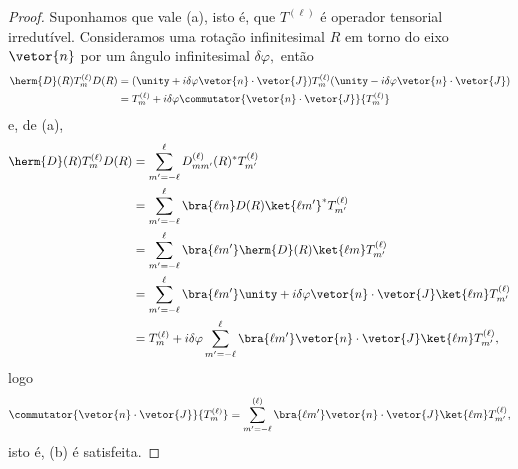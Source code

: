 \begin{proof}
   Suponhamos que vale (a), isto é, que \(T^{(\ell)}\) é operador tensorial irredutível. Consideramos uma rotação infinitesimal \(R\) em torno do eixo \(\vetor{n}\) por um ângulo infinitesimal \(\delta\varphi,\) então
   \begin{align*}
      \herm{D}(R) T^{(\ell)}_m D(R) &= (\unity + i \delta\varphi \vetor{n}\cdot \vetor{J})T^{(\ell)}_m(\unity - i \delta \varphi \vetor{n} \cdot \vetor{J})\\
                                &= T^{(\ell)}_m + i \delta\varphi \commutator{\vetor{n}\cdot \vetor{J}}{T^{(\ell)}_m}
   \end{align*}
   e, de (a),
   \begin{align*}
      \herm{D}(R) T^{(\ell)}_m D(R) &= \sum_{m' = -\ell}^{\ell}{D^{(\ell)}_{mm'}(R)^*T^{(\ell)}_{m'}}\\
                                    &= \sum_{m' = -\ell}^{\ell}{\bra{\ell m}D(R)\ket{\ell m'}^* T^{(\ell)}_{m'}}\\
                                    &= \sum_{m' = -\ell}^{\ell}{\bra{\ell m'}\herm{D}(R)\ket{\ell m} T^{(\ell)}_{m'}}\\
                                    &= \sum_{m' = -\ell}^{\ell}{\bra{\ell m'}\unity + i \delta \varphi \vetor{n}\cdot \vetor{J}\ket{\ell m} T^{(\ell)}_{m'}}\\
                                    &= T^{(\ell)}_{m} + i \delta \varphi\sum_{m' = - \ell}^{\ell}{\bra{\ell m'}\vetor{n}\cdot \vetor{J}\ket{\ell m} T^{(\ell)}_{m'}},
   \end{align*}
   logo
   \begin{equation*}
      \commutator{\vetor{n}\cdot \vetor{J}}{T^{(\ell)}_{m}} = \sum_{m' = -\ell}^{(\ell)}{\bra{\ell m'}\vetor{n}\cdot\vetor{J}\ket{\ell m} T^{(\ell)}_{m'}},
   \end{equation*}
   isto é, (b) é satisfeita.


\end{proof}
